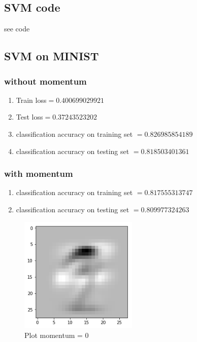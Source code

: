 \documentclass[letterpaper, 12]{article}
\begin{document}
\subsection{SVM code}
see code

\subsection{SVM on MINIST}
\subsubsection{without momentum}
\begin{enumerate}
	\item Train loss$=0.400699029921$
	\item Test loss$=0.37243523202$
	\item classification accuracy on training set $= 0.826985854189$
	\item classification accuracy on testing set $=0.818503401361$
\end{enumerate}

\subsubsection{with momentum}
\begin{enumerate}
	\item classification accuracy on training set $= 0.817555313747$
	\item classification accuracy on testing set $=0.809977324263$
\end{enumerate}

\begin{figure}[H]
\centering
\includegraphics[width=0.5\textwidth]{q2_3_1.png}
\caption{\label{}Plot momentum = 0 }
\end{figure}
\end{document}
